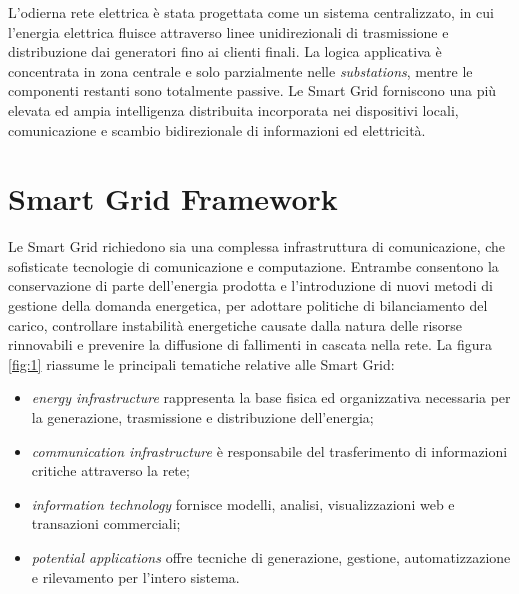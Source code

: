 L'odierna rete elettrica è stata progettata come un sistema centralizzato, in cui l'energia elettrica fluisce attraverso linee unidirezionali di trasmissione e distribuzione dai generatori fino ai clienti finali. La logica applicativa è concentrata in zona centrale e solo parzialmente nelle \emph{substations}, mentre le componenti restanti sono totalmente passive. Le Smart Grid forniscono una più elevata ed ampia intelligenza distribuita incorporata nei dispositivi locali, comunicazione e scambio bidirezionale di informazioni ed elettricità.

\section{Smart Grid Framework}
Le Smart Grid richiedono sia una complessa infrastruttura di comunicazione, che sofisticate tecnologie di comunicazione e computazione. Entrambe consentono la conservazione di parte dell'energia prodotta e l'introduzione di nuovi metodi di gestione della domanda energetica, per adottare politiche di bilanciamento del carico, controllare instabilità energetiche causate dalla natura delle risorse rinnovabili e prevenire la diffusione di fallimenti in cascata nella rete. 
\newline 
La figura \ref{fig:1} riassume le principali tematiche relative alle Smart Grid:
\begin{itemize}
	\item \emph{energy infrastructure} rappresenta la base fisica ed organizzativa necessaria per la generazione, trasmissione e distribuzione dell'energia;
	\item \emph{communication infrastructure} è responsabile del trasferimento di informazioni critiche attraverso la rete;
	\item \emph{information technology} fornisce modelli, analisi, visualizzazioni web e transazioni commerciali;
	\item \emph{potential applications} offre tecniche di generazione, gestione, automatizzazione e rilevamento per l'intero sistema.
\end{itemize} 

